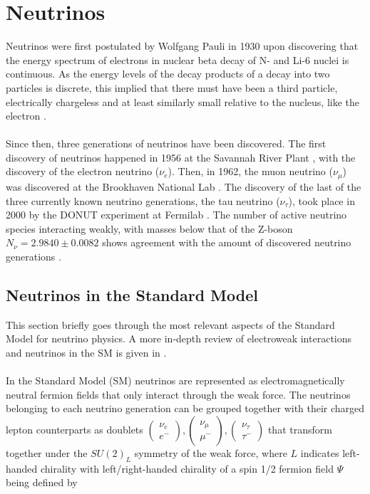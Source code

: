\documentclass[a4paper,12pt,numbered]{article}
\begin{document}
\section{Neutrinos}

Neutrinos were first postulated by Wolfgang Pauli in 1930 upon discovering that the energy spectrum of electrons in nuclear beta decay of N- and Li-6 nuclei is continuous. As the energy levels of the decay products of a decay into two particles is discrete, this implied that there must have been a third particle, electrically chargeless and at least similarly small relative to the nucleus, like the electron \cite{Pauli_Letter}.
\\ \\
Since then, three generations of neutrinos have been discovered. The first discovery of neutrinos happened in 1956 at the Savannah River Plant \cite{nuebar_discovery}, with the discovery of the electron neutrino ($\nu_e$). Then, in 1962, the muon neutrino ($\nu_\mu$) was discovered at the Brookhaven National Lab \cite{numu_discovery}. The discovery of the last of the three currently known neutrino generations, the tau neutrino ($\nu_\tau$), took place in 2000 by the DONUT experiment at Fermilab \cite{nutau_discovery}. The number of active neutrino species interacting weakly, with masses below that of the Z-boson $N_\nu =2.9840\pm0.0082$ shows agreement with the amount of discovered neutrino generations \cite{neunumber_constraints}.

\subsection{Neutrinos in the Standard Model}

This section briefly goes through the most relevant aspects of the Standard Model for neutrino physics. A more in-depth review of electroweak interactions and neutrinos in the SM is given in \cite{electroweak_lagrangian}.
\\ \\
In the Standard Model (SM) neutrinos are represented as electromagnetically neutral fermion fields that only interact through the weak force. The neutrinos belonging to each neutrino generation can be grouped together with their charged lepton counterparts as doublets $\begin{pmatrix} \nu_e \\ e^- \end{pmatrix}, \begin{pmatrix} \nu_\mu \\ \mu^- \end{pmatrix}, \begin{pmatrix} \nu_\tau \\ \tau^- \end{pmatrix}$ that transform together under the $SU(2)_L$ symmetry of the weak force, where $L$ indicates left-handed chirality  with left/right-handed chirality of a spin 1/2 fermion field $\Psi$ being defined by
\end{document}
